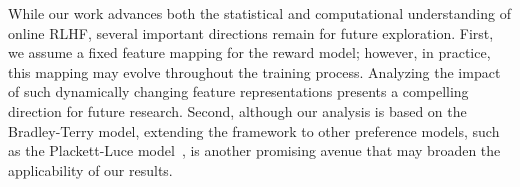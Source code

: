 While our work advances both the statistical and computational understanding of online RLHF, several important directions remain for future exploration. First, we assume a fixed feature mapping for the reward model; however, in practice, this mapping may evolve throughout the training process. Analyzing the impact of such dynamically changing feature representations presents a compelling direction for future research. Second, although our analysis is based on the Bradley-Terry model, extending the framework to other preference models, such as the Plackett-Luce model~\citep{59:Luce-choice,75:Plackett-permutations}, is another promising avenue that may broaden the applicability of our results.